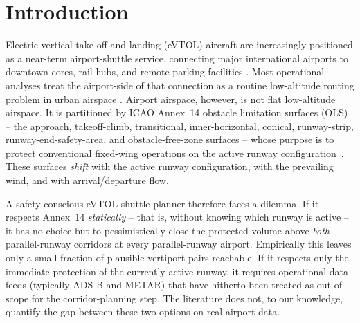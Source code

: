\section{Introduction}
\label{sec:intro}

Electric vertical-take-off-and-landing (eVTOL) aircraft are increasingly
positioned as a near-term airport-shuttle service, connecting major
international airports to downtown cores, rail hubs, and remote
parking facilities \citep{vascik2019,bulusu2021}. Most operational
analyses treat the airport-side of that connection as a routine
low-altitude routing problem in urban airspace
\citep{kleinbekman2020,pang2022}. Airport airspace, however, is not flat
low-altitude airspace. It is partitioned by ICAO Annex~14 obstacle
limitation surfaces (OLS) -- the approach, takeoff-climb, transitional,
inner-horizontal, conical, runway-strip, runway-end-safety-area, and
obstacle-free-zone surfaces -- whose purpose is to protect conventional
fixed-wing operations on the active runway configuration~\citep{icao_annex14}.
These surfaces \emph{shift} with the active runway configuration, with the
prevailing wind, and with arrival/departure flow.

A safety-conscious eVTOL shuttle planner therefore faces a dilemma. If it
respects Annex~14 \emph{statically} -- that is, without knowing which runway
is active -- it has no choice but to pessimistically close the protected
volume above \emph{both} parallel-runway corridors at every parallel-runway
airport. Empirically this leaves only a small fraction of plausible
vertiport pairs reachable. If it respects only the immediate protection of
the currently active runway, it requires operational data feeds (typically
ADS-B and METAR) that have hitherto been treated as out of scope for the
corridor-planning step. The literature does not, to our knowledge, quantify
the gap between these two options on real airport data.

